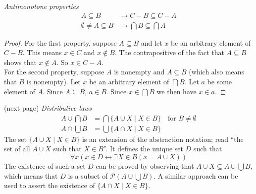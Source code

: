 \documentclass{report}
\begin{document}
\noindent\textit{Antimonotone properties}
\begin{align*}
A\subseteq B&\to C-B\subseteq C-A\\
\emptyset\neq A\subseteq B&\to\bigcap B\subseteq\bigcap A
\end{align*}
\begin{proof}
For the first property, suppose $A\subseteq B$ and let $x$ be an arbitrary element of $C-B$. This means $x\in C$ and $x\notin B$. The contrapositive of the fact that $A\subseteq B$ 
shows that $x\notin A$. So $x\in C-A$.\\
\indent For the second property, suppose $A$ is nonempty and $A\subseteq B$ (which also means that $B$ is nonempty). Let $x$ be an arbitrary element of $\bigcap B$. Let $a$ be some element of $A$. 
Since $A\subseteq B$, $a\in B$. Since $x\in\bigcap B$ we then have $x\in a$.
\end{proof}
\noindent(next page)\newpage
\noindent\textit{Distributive laws}
\begin{align*}
A\cup\bigcap B&=\bigcap\{A\cup X\mid X\in B\}\quad\text{for $B\neq\emptyset$}\\
A\cap\bigcup B&=\bigcup\{A\cap X\mid X\in B\}
\end{align*}
The set $\{A\cup X\mid X\in B\}$ is an extension of the abstraction notation; read ``the set of all $A\cup X$ such that $X\in B$''. It defines the unique set $D$ such that
\begin{equation*}
\forall x(x\in D\leftrightarrow\exists X\in B(x=A\cup X))
\end{equation*}
The existence of such a set $D$ can be proved by observing that $A\cup X\subseteq A\cup\bigcup B$, which means that $D$ is a subset of $\mathscr P(A\cup\bigcup B)$. A similar approach 
can be used to assert the existence of $\{A\cap X\mid X\in B\}$.
\end{document}
